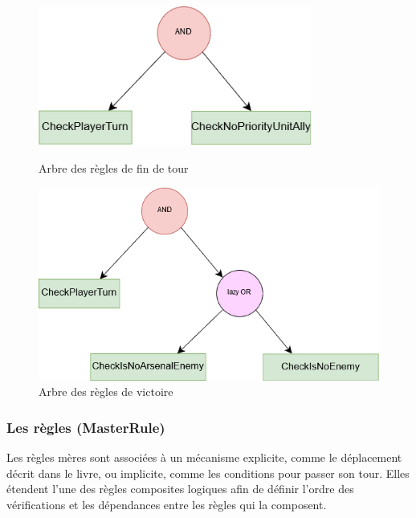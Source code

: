 \documentclass[a4paper]{report}
\begin{document}
\begin{figure}[!h]

\begin{minipage}{.5\textwidth}
\centering

\includegraphics[width=0.8\textwidth]{treeRules/ArbreEndRules.png}
\caption{Arbre des règles de fin de tour}
\label{fig:treeEnd}

\end{minipage}
\hfill
\begin{minipage}{.5\textwidth}
\centering

\includegraphics[width=1\textwidth]{treeRules/ArbreVictoryRules.png}
\caption{Arbre des règles de victoire}
\label{fig:treeVictory}

\end{minipage}

\end{figure}

\subsubsection{Les règles (MasterRule)}

Les règles mères sont associées à un mécanisme explicite, comme le déplacement décrit dans le livre, ou implicite, comme les conditions pour passer son tour. Elles étendent l'une des règles composites logiques afin de définir l'ordre des vérifications et les dépendances entre les règles qui la composent.
\end{document}
